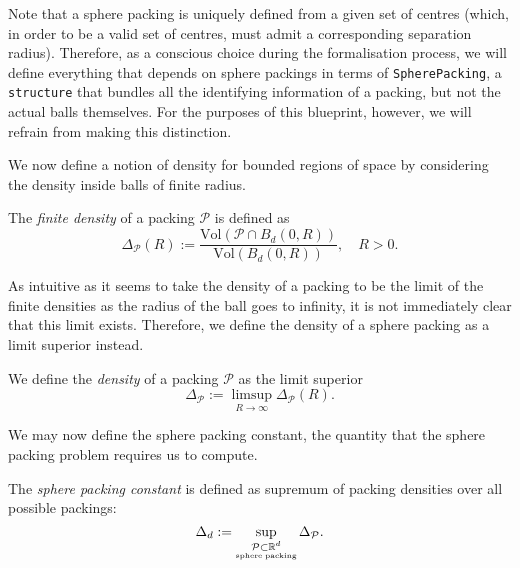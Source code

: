 \begin{remark}\label{SpherePacking}\leanok
  Note that a sphere packing is uniquely defined from a given set of centres (which, in order to be a valid set of centres, must admit a corresponding separation radius). Therefore, as a conscious choice during the formalisation process, we will define everything that depends on sphere packings in terms of \verb|SpherePacking|, a \verb|structure| that bundles all the identifying information of a packing, but not the actual balls themselves. For the purposes of this blueprint, however, we will refrain from making this distinction.
\end{remark}

We now define a notion of density for bounded regions of space by considering the density inside balls of finite radius.

\begin{definition}\label{SpherePacking.finiteDensity}\leanok
  The \emph{finite density} of a packing $\mathcal{P}$ is defined as
  \[
    \Delta_{\mathcal{P}}(R):=\frac{\mathrm{Vol}(\mathcal{P}\cap B_d(0,R))}{\mathrm{Vol}(B_d(0,R))},\quad R>0.
  \]
\end{definition}

As intuitive as it seems to take the density of a packing to be the limit of the finite densities as the radius of the ball goes to infinity, it is not immediately clear that this limit exists. Therefore, we define the density of a sphere packing as a limit superior instead.

\begin{definition}\label{SpherePacking.density}\leanok
  We define the \emph{density} of a packing $\mathcal{P}$ as the limit superior
  \[
    \Delta_{\mathcal{P}}:=\limsup\limits_{R\to\infty}\Delta_{\mathcal{P}}(R).
  \]
\end{definition}

We may now define the sphere packing constant, the quantity that the sphere packing problem requires us to compute.

\begin{definition}\label{SpherePackingConstant}\leanok
  The \emph{sphere packing constant} is defined as supremum of packing densities over all possible packings:
  \[
    \Delta_d:=\sup\limits_{\substack{\mathcal{P}\subset\mathbb{R}^d\\ \scriptscriptstyle\mathrm{sphere}\;\mathrm{packing}}}\Delta_{\mathcal{P}}.
  \]
\end{definition}
